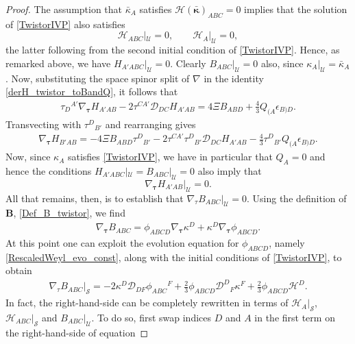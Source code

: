 \documentclass[10pt,a4paper]{article}
\theoremstyle{plain}
\def\bmB{{\bm B}}
\begin{document}
\begin{proof}
 The assumption that $\bar{\kappa}_A$ satisfies
 $\mathcal{H}(\bar{\bm\kappa})_{ABC}=0$ implies that the solution of
 \eqref{TwistorIVP} also satisfies
\[\mathcal{H}_{ABC}|_{\mathcal{U}}=0, \qquad \mathcal{H}_A|_{\mathcal{U}}=0,\]
the latter following from the second initial condition of
\eqref{TwistorIVP}. Hence, as remarked above, we have
$H_{A'ABC}|_{\mathcal{U}}=0$. Clearly $B_{ABC}|_{\mathcal{U}}=0$ also,
since $\kappa_A|_{\mathcal{U}}=\bar{\kappa}_A$. Now, substituting the
space spinor split of $\nabla$ in the identity
\eqref{derH_twistor_toBandQ}, it follows that
\begin{align*}
  \tau _{D}{}^{A'}\nabla_{\bm\tau} H_{A'AB} -2 \tau ^{CA'} \mathcal{D}
  _{DC}H_{A'AB} = 4\Xi B_{ABD} + \tfrac{4}{3} Q_{(A}\epsilon _{B)D}.
\end{align*}
Transvecting with $\tau^{D}{}_{B'}$ and rearranging gives
\begin{align}\label{time-derHToBHQ}
\nabla_{\bm\tau} H_{B'AB} = -4 \Xi B_{ABD} \tau ^{D}{}_{B'} -2 \tau
^{CA'} \tau ^{D}{}_{B'} \mathcal{D} _{DC}H_{A'AB} - \tfrac{4}{3} \tau
^{D}{}_{B'}Q_{(A}\epsilon _{B)D}.
\end{align}
Now, since $\kappa_A$ satisfies \eqref{TwistorIVP}, we have in
particular that $Q_A=0$ and hence the conditions
$H_{A'ABC}|_{\mathcal{U}} = B_{ABC}|_{\mathcal{U}}=0$ also imply that
\[\nabla_{\bm\tau} H_{A'AB}|_{\mathcal{U}}=0.\] 
All that remains, then, is to establish that
$\nabla_{\tau}B_{ABC}|_{\mathcal{U}}=0$. Using the definition of
$\bmB$, \eqref{Def_B_twistor}, we find
\begin{align*}
\nabla_{\bm\tau} B_{ABC} = \phi _{ABCD}\nabla_{\bm\tau} \kappa ^{D} +
\kappa ^{D} \nabla_{\bm\tau} \phi _{ABCD} .
\end{align*}
At this point one can exploit the evolution equation for
$\phi_{ABCD}$, namely \eqref{RescaledWeyl_evo_const}, along with the
initial conditions of \eqref{TwistorIVP}, to obtain
\begin{align}\label{normalderB_twistor_exp}
\nabla_{\tau}B_{ABC}|_{\mathcal{S}}= -2\kappa ^{D} \mathcal{D}
_{DF}\phi _{ABC}{}^{F} + \tfrac{2}{3} \phi _{ABCD} \mathcal{D}
^{D}{}_{F}\kappa ^{F} + \tfrac{2}{3}\phi_{ABCD}\mathcal{H}^D .
\end{align}
In fact, the right-hand-side can be completely rewritten in terms of
$\mathcal{H}_A|_{\mathcal{S}}$, $\mathcal{H}_{ABC}|_{\mathcal{S}}$ and
$B_{ABC}|_{\mathcal{U}}$. To do so, first swap indices $D$ and $A$ in
the first term on the right-hand-side of equation

\end{proof}
\end{document}
